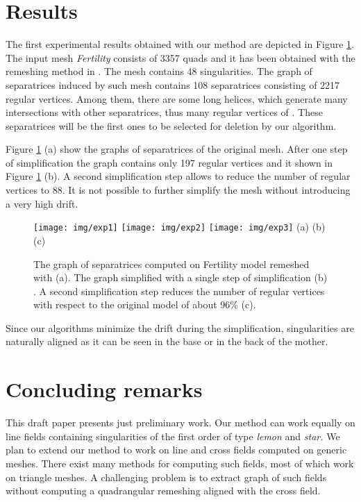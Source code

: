 \documentclass[11pt,a4paper]{article}
\begin{document}
\section{Results}
\label{sec:results}

The first experimental results obtained with our method are depicted in Figure \ref{fig:fert}.
The input mesh \emph{Fertility} consists of 3357 quads and it has been obtained with the remeshing method in \cite{BomZimKob09}.
The mesh contains 48 singularities.
The graph  of separatrices induced by such mesh contains 108 separatrices consisting of 2217 regular vertices.
Among them, there are some long helices, which generate many intersections with other separatrices, thus many regular vertices of .
These separatrices will be the first ones to be selected for deletion by our algorithm.

Figure \ref{fig:fert} (a) show the graphs of separatrices of the original mesh. After one step of simplification the graph contains only 197 regular vertices and it shown in Figure \ref{fig:fert} (b). A second simplification step allows to reduce the number of regular vertices to 88. It is not possible to further simplify the mesh without introducing a very high drift.

\begin{figure}
\centering
\texttt{[image: img/exp1]} 
\texttt{[image: img/exp2]} 
\texttt{[image: img/exp3]} 
\hspace{1.5cm} (a) \hspace{4cm} (b) \hspace{4cm} (c) 

\hfill\mbox{}
\caption{\label{fig:fert} The graph of separatrices computed on Fertility model remeshed with \cite{BomZimKob09} (a). The graph simplified with a single step of simplification (b) . A second simplification step reduces the number of regular vertices with respect to the original model of about 96\% (c).
}
\end{figure}

Since our algorithms minimize the drift during the simplification, singularities are naturally aligned as it can be seen in the base or in the back of the mother. 

\section{Concluding remarks}
\label{sec:conc}
This draft paper presents just preliminary work.
Our method can work equally on line fields containing singularities of the first order of type \emph{lemon} and \emph{star.}
We plan to extend our method to work on line and cross fields computed on generic meshes. 
There exist many methods for computing such fields, most of which work on triangle meshes.
A challenging problem is to extract graph  of such fields without computing a quadrangular remeshing aligned with the cross field.  

  













\end{document}
